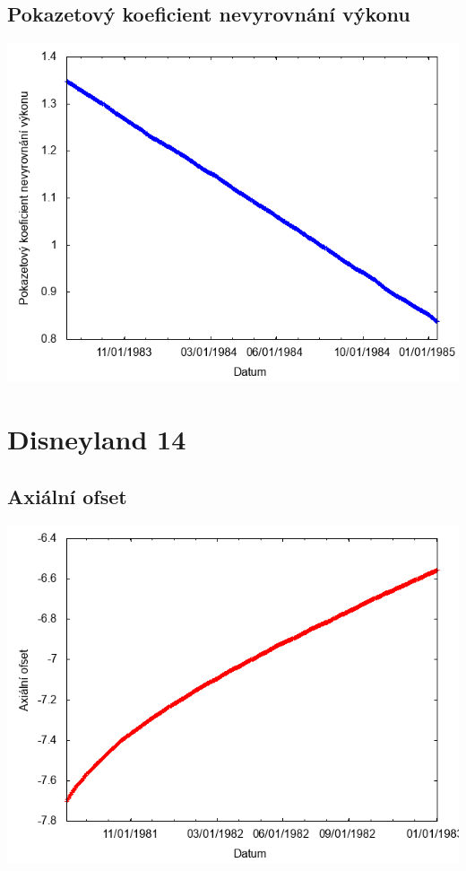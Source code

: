\documentclass[a4paper,twoside,11pt]{article}
\begin{document}
\subsection*{Pokazetový koeficient nevyrovnání výkonu}
\begin{center}
\includegraphics[width=.8\textwidth]{graphs/Disneyland_13_fha.png}
\end{center}

\newpage
\section*{Disneyland 14}
\subsection*{Axiální ofset}
\begin{center}
\includegraphics[width=.8\textwidth]{graphs/Disneyland_14_ao.png}
\end{center}
\end{document}
